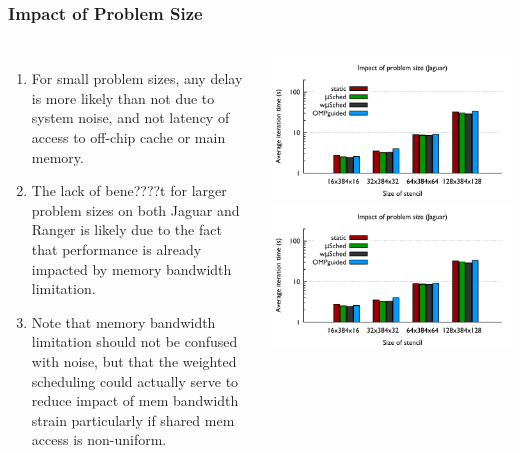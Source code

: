 \begin{frame}
\frametitle{Impact of Problem Size}
\begin{columns}
\begin{enumerate}
\tiny \item \tiny For small problem sizes, any delay is more likely than
not due to system noise, and not latency of access to off-chip cache
or main memory. 

\item \tiny The lack of bene????t for larger problem sizes on both
  Jaguar and Ranger is likely due to the fact
that performance is already impacted by memory bandwidth
limitation.  %
\item \tiny Note that memory bandwidth limitation should not be
  confused with noise, but that the weighted scheduling could actually serve
to reduce impact of mem bandwidth strain particularly if shared mem access
is non-uniform. 
\end{enumerate} 

\includegraphics[width=\textwidth]{images/probsize_jaguar}
\includegraphics[width=\textwidth]{images/probsize_ranger}
\end{columns}
\end{frame} 
 
